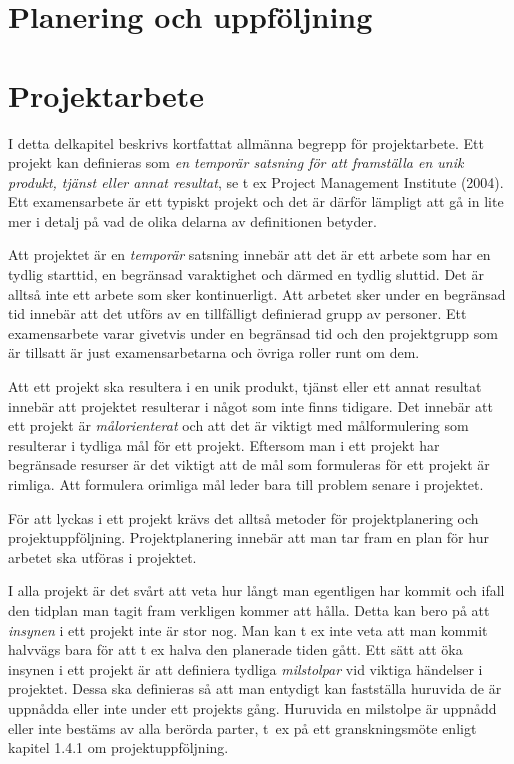 \section{Planering och uppföljning}\label{planering-och-uppfuxf6ljning}

\section{Projektarbete}\label{projektarbete}

I detta delkapitel beskrivs kortfattat allmänna begrepp för
projektarbete. Ett projekt kan definieras som \emph{en temporär satsning
för att framställa en unik produkt, tjänst eller annat resultat}, se t
ex Project Management Institute (2004). Ett examensarbete är ett typiskt
projekt och det är därför lämpligt att gå in lite mer i detalj på vad de
olika delarna av definitionen betyder.

Att projektet är en \emph{temporär} satsning innebär att det är ett
arbete som har en tydlig starttid, en begränsad varaktighet och därmed
en tydlig sluttid. Det är alltså inte ett arbete som sker kontinuerligt.
Att arbetet sker under en begränsad tid innebär att det utförs av en
tillfälligt definierad grupp av personer. Ett examensarbete varar
givetvis under en begränsad tid och den projektgrupp som är tillsatt är
just examensarbetarna och övriga roller runt om dem.

Att ett projekt ska resultera i en unik produkt, tjänst eller ett annat
resultat innebär att projektet resulterar i något som inte finns
tidigare. Det innebär att ett projekt är \emph{målorienterat} och att
det är viktigt med målformulering som resulterar i tydliga mål för ett
projekt. Eftersom man i ett projekt har begränsade resurser är det
viktigt att de mål som formuleras för ett projekt är rimliga. Att
formulera orimliga mål leder bara till problem senare i projektet.

För att lyckas i ett projekt krävs det alltså metoder för
projektplanering och projektuppföljning. Projektplanering innebär att
man tar fram en plan för hur arbetet ska utföras i projektet.

I alla projekt är det svårt att veta hur långt man egentligen har kommit
och ifall den tidplan man tagit fram verkligen kommer att hålla. Detta
kan bero på att \emph{insynen} i ett projekt inte är stor nog. Man kan t
ex inte veta att man kommit halvvägs bara för att t ex halva den
planerade tiden gått. Ett sätt att öka insynen i ett projekt är att
definiera tydliga \emph{milstolpar} vid viktiga händelser i projektet.
Dessa ska definieras så att man entydigt kan fastställa huruvida de är
uppnådda eller inte under ett projekts gång. Huruvida en milstolpe är
uppnådd eller inte bestäms av alla berörda parter, t~ex på ett
granskningsmöte enligt kapitel 1.4.1 om projektuppföljning.

